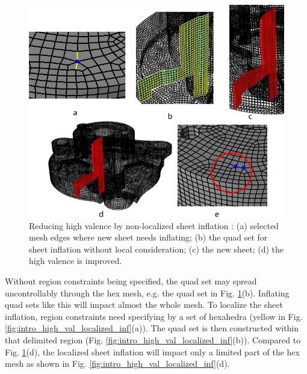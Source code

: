 \documentclass[final,5p,times,twocolumn]{elsarticle}
\begin{document}
\begin{figure}[htbp]
\begin{center}
\includegraphics[width=12cm]{intro_high_val_whole.png}
\caption{Reducing high valence by non-localized sheet inflation : (a) selected mesh edges where new sheet needs inflating; (b) the quad set for sheet inflation without local consideration; (c) the new sheet; (d) the high valence is improved.}
\label{fig:intro_high_val_whole}
\end{center}
\end{figure}

Without region constraints being specified, the quad set may spread uncontrollably through the hex mesh, e.g. the quad set in Fig. \ref{fig:intro_high_val_whole}(b). Inflating quad sets like this will impact almost the whole mesh. To localize the sheet inflation, region constraints need specifying by a set of hexahedra (yellow in Fig. \ref{fig:intro_high_val_localized_inf}(a)). The quad set is then constructed within that delimited region (Fig. \ref{fig:intro_high_val_localized_inf}(b)). Compared to Fig. \ref{fig:intro_high_val_whole}(d), the localized sheet inflation will impact only a limited part of the hex mesh as shown in Fig. \ref{fig:intro_high_val_localized_inf}(d).
\end{document}
